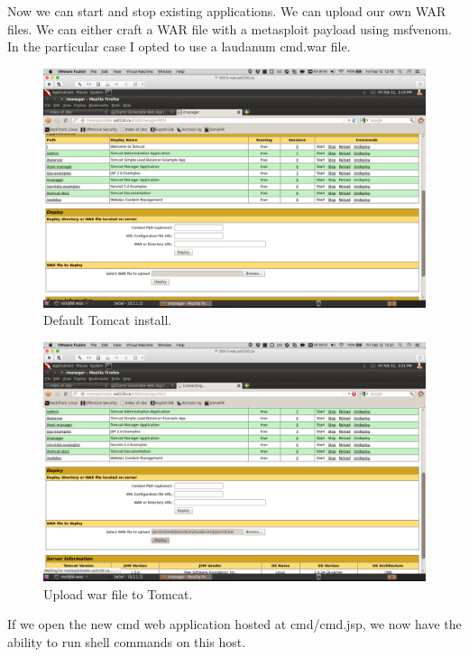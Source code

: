\documentclass{article}
\begin{document}
Now we can start and stop existing applications. We can upload our own WAR files.
We can either craft a WAR file with a metasploit payload using msfvenom. In the 
particular case I opted to use a laudanum cmd.war file.

\begin{figure}[h!]
	\includegraphics[width=\linewidth]{images/tomcat-metasploitable-deploy.png}
	\caption{Default Tomcat install.}
	\label{fig:tomcat-injection3}
\end{figure}

\begin{figure}[h!]
	\includegraphics[width=\linewidth]{images/tomcat-metasploitable-upload.png}
	\caption{Upload war file to Tomcat.}
	\label{fig:tomcat-injection4}
\end{figure}

If we open the new cmd web application hosted at cmd/cmd.jsp, we now have the
ability to run shell commands on this host.
\end{document}
